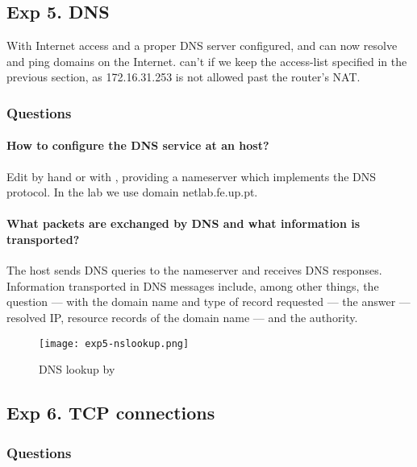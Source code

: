 \documentclass[compilation.tex]{subfiles}
\begin{document}
	\subsection[DNS]{Exp 5. DNS}
	\label{exp:5}
	
	With Internet access and a proper DNS server configured,  and  can now resolve and ping domains on the Internet.  can't if we keep the access-list specified in the previous section, as 172.16.31.253 is not allowed past the router's NAT.
	
	\subsubsection{Questions}
	\label{subsubsec:exp5questions}
	
	\paragraph{How to configure the DNS service at an host?}
	Edit  by hand or with , providing a nameserver which implements the DNS protocol. In the lab we use domain netlab.fe.up.pt.
	
	\paragraph{What packets are exchanged by DNS and what information is transported?}
	The host sends DNS queries to the nameserver and receives DNS responses. Information transported in DNS messages include, among other things, the question --- with the domain name and type of record requested --- the answer --- resolved IP, resource records of the domain name --- and the authority.
	
	\begin{figure}[htb]
		\centering
		\texttt{[image: exp5-nslookup.png]}
		\caption{DNS lookup by }
		\label{fig:exp5-nslookup}
	\end{figure}
	
	\subsection[TCP connections]{Exp 6. TCP connections}
	\label{exp:6}
	
	\subsubsection{Questions}
	\label{subsubsec:exp6questions}
	
\end{document}

